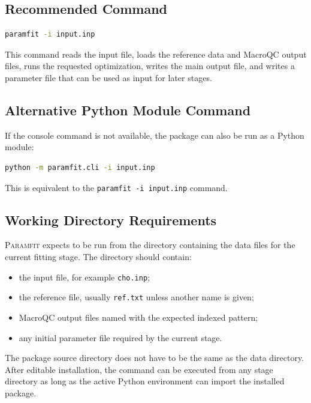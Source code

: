 \documentclass[11pt]{article}
\begin{document}
\subsection{Recommended Command}

\begin{lstlisting}[language=bash]
paramfit -i input.inp
\end{lstlisting}

This command reads the input file, loads the reference data and MacroQC output
files, runs the requested optimization, writes the main output file, and writes a
parameter file that can be used as input for later stages.

\subsection{Alternative Python Module Command}

If the console command is not available, the package can also be run as a Python
module:

\begin{lstlisting}[language=bash]
python -m paramfit.cli -i input.inp
\end{lstlisting}

This is equivalent to the \texttt{paramfit -i input.inp} command.

\subsection{Working Directory Requirements}

\textsc{Paramfit} expects to be run from the directory containing the data files
for the current fitting stage. The directory should contain:

\begin{itemize}[leftmargin=*]
  \item the input file, for example \texttt{cho.inp};
  \item the reference file, usually \texttt{ref.txt} unless another name is given;
  \item MacroQC output files named with the expected indexed pattern;
  \item any initial parameter file required by the current stage.
\end{itemize}

The package source directory does not have to be the same as the data directory.
After editable installation, the command can be executed from any stage directory
as long as the active Python environment can import the installed package.
\end{document}

